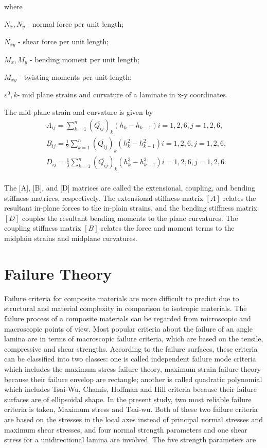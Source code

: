 where

$N_x,N_y $  - normal force per unit length;

$N_{xy} $  - shear force per unit length;

$M_x, M_y $ - bending moment per unit length;

$M_{xy} $  - twisting moments per unit length;

$\varepsilon^{0}, k $- mid plane strains and curvature of a laminate in x-y
coordinates.

The mid plane strain and curvature is given by
\begin{equation}
    \begin{split}
    &A_{ij}=\sum_{k=1}^{n}(\overline{Q_{ij}})_k(h_k-h_{k-1})  i=1,2,6, j=1,2,6,\\
    &B_{ij}=\frac{1}{2}\sum_{k=1}^{n}(\overline{Q_{ij}})_k(h_k^2 - h_{k-1}^2)
	i=1,2,6, j=1,2,6,\\
    &D_{ij}=\frac{1}{3}\sum_{k=1}^{n}(\overline{Q_{ij}})_k(h_k^3 - h_{k-1}^3)
	i=1,2,6, j=1,2,6.\\
    \end{split}
\end{equation}

The [A], [B], and [D] matrices are called the extensional, coupling, and bending stiffness matrices,
respectively. The extensional stiffness matrix $[A]$ relates the resultant in-plane forces to the
in-plain strains, and the bending stiffness matrix $[D]$ couples the resultant bending moments to
the plane curvatures.  The coupling stiffness matrix $[B]$ relates the force and moment terms to the
midplain strains and midplane curvatures.

\section{Failure Theory}

Failure criteria for composite materials are more difficult to predict due to
structural and material complexity in comparison to isotropic materials. The
failure process of a composite materials can be regarded from microscopic and
macroscopic points of view. Most popular criteria about the failure of an angle
lamina are in terms of macroscopic failure criteria, which are based on the
tensile, compressive and shear strengths. According to the failure surfaces,
these criteria can be classified into two classes: one is called independent
failure mode criteria which includes the maximum stress failure theory, maximum
strain failure theory because their failure envelop are rectangle; another is
called quadratic polynomial which includes Tsai-Wu, Chamis, Hoffman and Hill
criteria because their failure surfaces are of ellipsoidal shape. In the present
study, two most reliable failure criteria is taken, Maximum stress and Tsai-wu.
Both of these two failure criteria are based on the stresses in the local axes
instead of principal normal stresses and maximum shear stresses, and four normal
strength parameters and one shear stress for a unidirectional lamina are
involved. The five strength parameters are

